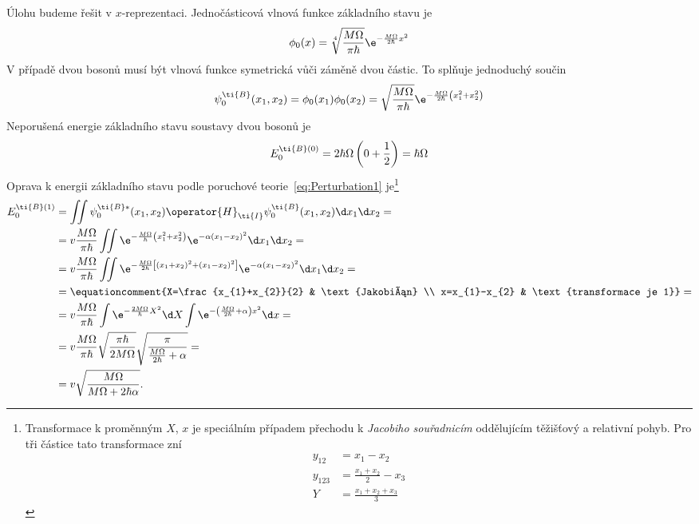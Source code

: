 \begin{solution}
	Úlohu budeme řešit v $x$-reprezentaci.
	Jednočásticová vlnová funkce základního stavu je
	\begin{equation}
		\phi_{0}(x)
			=\sqrt[4]{\frac{M\Omega}{\pi\hbar}}\e^{-\frac{M\Omega}{2\hbar}x^{2}}
	\end{equation}
	V případě dvou bosonů musí být vlnová funkce symetrická vůči záměně dvou částic.
	To splňuje jednoduchý součin
	\begin{equation}\label{eq:IdenticalBosonsWaveFunction}
		\psi_{0}^{\ti{B}}(x_{1},x_{2})
			=\phi_{0}(x_{1})\phi_{0}(x_{2})
			=\sqrt{\frac{M\Omega}{\pi\hbar}}\e^{-\frac{M\Omega}{2\hbar}\left(x_{1}^{2}+x_{2}^{2}\right)}
	\end{equation}			
	Neporušená energie základního stavu soustavy dvou bosonů je
	\begin{equation}
		E_{0}^{\ti{B}(0)}
			=2\hbar\Omega\left(0+\frac{1}{2}\right)
			=\hbar\Omega
	\end{equation}
	Oprava k energii základního stavu podle poruchové teorie~\eqref{eq:Perturbation1} je\footnote{
		Transformace k proměnným $X$, $x$ je speciálním případem přechodu k \emph{Jacobiho souřadnicím}
		oddělujícím těžišťový a relativní pohyb.
		Pro tři částice tato transformace zní
        \begin{subequations}
            \begin{align}
                y_{12}&=x_{1}-x_{2}\\
                y_{123}&=\frac{x_{1}+x_{2}}{2}-x_{3}\\
                Y&=\frac{x_{1}+x_{2}+x_{3}}{3}
            \end{align}                
        \end{subequations}
	}
	\begin{align}
		E_{0}^{\ti{B}(1)}
			&=\iint\psi^{\ti{B}*}_{0}(x_{1},x_{2})\operator{H}_{\ti{I}}\psi_{0}^{\ti{B}}(x_{1},x_{2})\d x_{1}\d x_{2}=\nonumber\\
			&=v\frac{M\Omega}{\pi\hbar}\iint\e^{-\frac{M\Omega}{\hbar}\left(x_{1}^{2}+x_{2}^{2}\right)}
				\e^{-\alpha\left(x_{1}-x_{2}\right)^{2}}\d x_{1}\d x_{2}=\nonumber\\
			&=v\frac{M\Omega}{\pi\hbar}\iint\e^{-\frac{M\Omega}{2\hbar}
				\left[\left(x_{1}+x_{2}\right)^{2}+\left(x_{1}-x_{2}\right)^{2}\right]}
				\e^{-\alpha\left(x_{1}-x_{2}\right)^{2}}\d x_{1}\d x_{2}=\nonumber\\
			&=\equationcomment{X=\frac{x_{1}+x_{2}}{2} & \text{Jakobián} \\
				x=x_{1}-x_{2} & \text{transformace je 1}}=\nonumber\\
			&=v\frac{M\Omega}{\pi\hbar}\int\e^{-\frac{2M\Omega}{\hbar}X^{2}}\d X
				\int\e^{-\left(\frac{M\Omega}{2\hbar}+\alpha\right)x^{2}}\d x=\nonumber\\
			&=v\frac{M\Omega}{\pi\hbar}\sqrt{\frac{\pi\hbar}{2M\Omega}}
				\sqrt{\frac{\pi}{\frac{M\Omega}{2\hbar}+\alpha}}=\nonumber\\
			&=v\sqrt{\frac{M\Omega}{M\Omega+2\hbar\alpha}}.
	\end{align} 
\end{solution}
